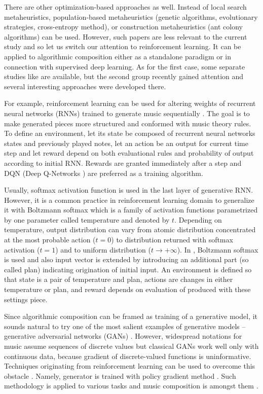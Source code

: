 \documentclass{article}
\begin{document}
There are other optimization-based approaches as well. Instead of local search metaheuristics, population-based metaheuristics (genetic algorithms, evolutionary strategies, cross-entropy method), or construction metaheuristics (ant colony algorithms) can be used. However, such papers are less relevant to the current study and so let us switch our attention to reinforcement learning. It can be applied to algorithmic composition either as a standalone paradigm or in connection with supervised deep learning. As for the first case, some separate studies like \cite{yi2007automatic, smith2012reinforcement} are available, but the second group recently gained attention and several interesting approaches were developed there.

For example, reinforcement learning can be used for altering weights of recurrent neural networks (RNNs) trained to generate music sequentially \cite{jaques2016generating, kotecha2018bach}. The goal is to make generated pieces more structured and conformed with music theory rules. To define an environment, let its state be composed of recurrent neural networks states and previously played notes, let an action be an output for current time step and let reward depend on both evaluational rules and probability of output according to initial RNN. Rewards are granted immediately after a step and DQN (Deep Q-Networks \cite{mnih2013playing}) are preferred as a training algorithm.

Usually, softmax activation function is used in the last layer of generative RNN. However, it is a common practice in reinforcement learning domain to generalize it with Boltzmann softmax which is a family of activation functions parametrized by one parameter called temperature and denoted by $t$. Depending on temperature, output distribution can vary from atomic distribution concentrated at the most probable action ($t = 0$) to distribution returned with softmax activation ($t = 1$) and to uniform distribution ($t \to +\infty$). In \cite{kumar2019polyphonic}, Boltzmann softmax is used and also input vector is extended by introducing an additional part (so called plan) indicating origination of initial input. An environment is defined so that state is a pair of temperature and plan, actions are changes in either temperature or plan, and reward depends on evaluation of produced with these settings piece.

Since algorithmic composition can be framed as training of a generative model, it sounds natural to try one of the most salient examples of generative models -- generative adversarial networks (GANs) \cite{goodfellow2014gan}. However, widespread notations for music assume sequences of discrete values but classical GANs work well only with continuous data, because gradient of discrete-valued functions is uninformative. Techniques originating from reinforcement learning can be used to overcome this obstacle \cite{yu2016seqgan,hjelm2017boundary}. Namely, generator is trained with policy gradient method \cite{williams1992simple}. Such methodology is applied to various tasks and music composition is amongst them \cite{limaguimaraes2017objective}.
\end{document}
